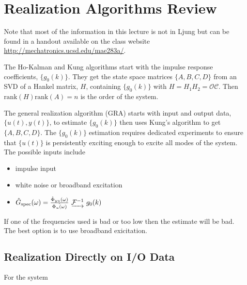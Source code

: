 \mainmatter%
\setcounter{page}{1}

\lectureseries[\course]{\course}

\date{October 29, 2009}

\setaddress%

\setcounter{lecture}{10}
\setcounter{chapter}{10}


\section{Realization Algorithms Review}
Note that most of the information in this lecture is not in Ljung but can be found in a handout available on the class website \\ \href{http://mechatronics.ucsd.edu/mae283a/}{http://mechatronics.ucsd.edu/mae283a/}.

The Ho-Kalman and Kung algorithms start with the impulse response coefficients, $\{g_0(k)\}$.
They get the state space matrices $\{A,B,C,D\}$ from an SVD of a Hankel matrix, $H$, containing $\{g_0(k)\}$ with $H=H_1H_2=\mathcal{OC}$.
Then $\text{rank} (H)\text{rank} (A)=n$ is the order of the system.

The general realization algorithm (GRA) starts with input and output data, $\{u (t),y (t)\}$, to estimate $\{g_0(k)\}$ then uses Kung's algorithm to get $\{A,B,C,D\}$.
The $\{g_0(k)\}$ estimation requires dedicated experiments to ensure that $\{u (t)\}$ is persistently exciting enough to excite all modes of the system.
The possible inputs include
\begin{itemize}
\item impulse input
\item white noise or broadband excitation
\item $\hat{G}_{\text{spec}} (\omega) = \frac{\hat{\Phi}_{yu} (\omega)}{\hat{\Phi_u (\omega)}}~\underrightarrow{\mathcal{F}^{-1}}~g_0(k)$
\end{itemize}
If one of the frequencies used is bad or too low then the estimate will be bad.
The best option is to use broadband exicitation.

\subsection{Realization Directly on I/O Data}
For the system

